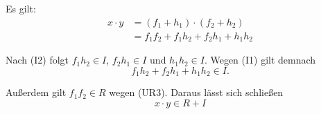 \documentclass[a4paper,12pt]{article}
\begin{document}
Es gilt:
\begin{align*}
  x \cdot y &= (f_1 + h_1) \cdot (f_2 + h_2) \\
            &= f_1 f_2 + f_1 h_2 + f_2 h_1 + h_1 h_2
\end{align*}

Nach (I2) folgt $f_1 h_2 \in I$, $f_2 h_1 \in I$ und $h_1 h_2 \in I$. Wegen (I1) gilt demnach
\[
  f_1 h_2 + f_2 h_1 + h_1 h_2 \in I.
\]

Außerdem gilt $f_1 f_2 \in R$ wegen (UR3). Daraus lässt sich schließen
\[
  x \cdot y \in R + I
\]
\end{document}
